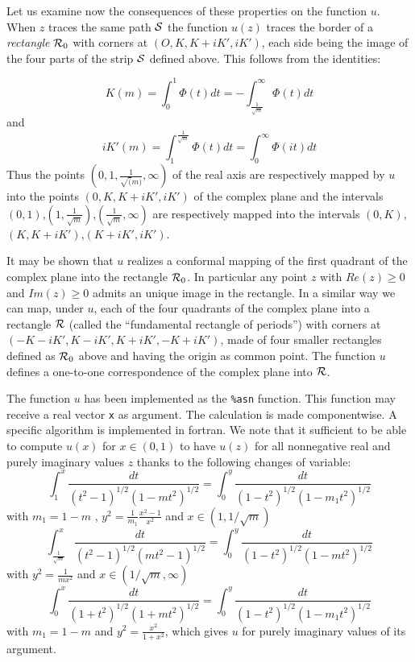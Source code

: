 Let us examine now the consequences of these properties on the function $u$.
When $z$ traces the  same path ${\cal S}$ the function $u(z)$ traces the border of a {\em rectangle} ${\cal R}_0$ with corners at $(O,K,K+iK',iK')$, each side being the image of the four parts of the strip ${\cal S}$ defined above.
This follows from the identities:

$$K(m)=\int_{0}^{1}{\Phi(t)dt}=-\int_{\frac{1}{\sqrt{m}}}^{\infty}{\Phi(t)dt}$$ and
$$iK'(m)=\int_{1}^{\frac{1}{\sqrt{m}}}{\Phi(t)dt}=\int_{0}^{\infty}{\Phi(it)dt}$$
Thus the points $(0,1,\frac{1}{\sqrt(m)},\infty)$ of the real axis are respectively mapped by $u$ into the points $(0,K,K+iK',iK')$ of the complex plane and the intervals $(0,1)$,$(1,\frac{1}{\sqrt{m}})$,$(\frac{1}{\sqrt{m}},\infty)$ are respectively mapped into the intervals $(0,K)$,$(K,K+iK')$,$(K+iK',iK')$.

It may be shown that $u$ realizes a conformal mapping of the first quadrant of the complex plane into the rectangle ${\cal R}_0$.
In particular any point $z$ with $Re(z) \geq 0$ and $Im(z) \geq 0$ admits an unique image in the rectangle.
In a similar way we can map, under  $u$, each of the four quadrants of the complex plane into a rectangle ${\cal R}$ (called the ``fundamental rectangle of periods'') with corners at
$(-K-iK',K-iK',K+iK',-K+iK')$, made of four smaller rectangles defined as ${\cal R}_0$ above and having the origin as common point.
The function $u$ defines a one-to-one correspondence of the complex plane into ${\cal R}$.

The function $u$ has been implemented as the {\tt \%asn} function.  This function may receive a real vector {\tt x} as argument.  The calculation is made componentwise.  A specific algorithm \cite{Carlson} is implemented in fortran.
We note that it sufficient to be able to compute $u(x)$ for $x \in (0,1)$ to have $u(z)$ for all nonnegative real and purely imaginary values $z$ thanks to the following changes of variable:
$$
\int_{1}^{x}{\frac{dt}{{(t^2-1)}^{1/2}{(1-m t^2)}^{1/2}}} = \int_{0}^{y}{\frac{dt}{{(1-t^2)}^{1/2}{(1-m_{1} t^2)}^{1/2}}}
$$
with $m_1=1-m$ , $y^2 = \frac{1}{m_1} \frac{x^2-1}{x^2}$ and $x \in (1,1/\sqrt{m})$
$$
\int_{\frac{1}{\sqrt{m}}}^{x}{\frac{dt}{{(t^2-1)}^{1/2}{(m t^2-1)}^{1/2}}} = \int_{0}^{y}{\frac{dt}{{(1-t^2)}^{1/2}{(1-m t^2)}^{1/2}}}
$$
with $y^2 = \frac{1}{m x^2}$ and $ x \in (1/\sqrt{m},\infty)$
$$
\int_{0}^{x}{\frac{dt}{{(1+t^2)}^{1/2}{(1+m t^2)}^{1/2}}} = \int_{0}^{y}{\frac{dt}{{(1-t^2)}^{1/2}{(1-m_{1} t^2)}^{1/2}}}
$$
with $m_1 = 1-m$ and $y^2 = \frac{x^2}{1 + x^2}$, which gives $u$ for purely imaginary values of its argument.

